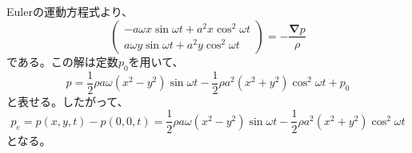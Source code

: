 \documentclass[a4paper]{jsarticle}
\begin{document}
\subsection{}
Eulerの運動方程式より、
\begin{equation}
  \begin{pmatrix}
    -a \omega x \sin \omega t + a^2 x \cos^2 \omega t \\
    a \omega y \sin \omega t + a^2 y \cos^2 \omega t
  \end{pmatrix} =
  -\frac{\boldsymbol{\nabla} p}{\rho}
\end{equation}
である。この解は定数$p_0$を用いて、
\begin{equation}
  p = \frac{1}{2} \rho a \omega (x^2 - y^2) \sin \omega t
  - \frac{1}{2} \rho a^2 (x^2 + y^2) \cos^2 \omega t + p_0
\end{equation}
と表せる。したがって、
\begin{equation}
  p_e = p(x, y, t) - p(0, 0, t)
  = \frac{1}{2} \rho a \omega (x^2 - y^2) \sin \omega t
  - \frac{1}{2} \rho a^2 (x^2 + y^2) \cos^2 \omega t
\end{equation}
となる。
\end{document}

